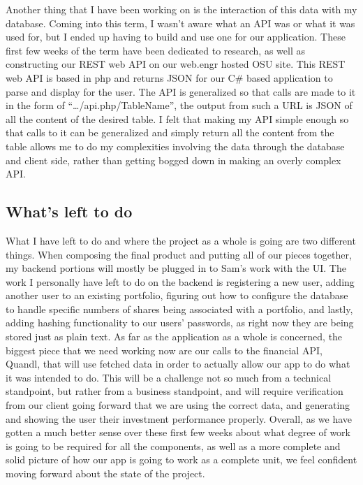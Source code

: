 \documentclass[letterpaper,10pt,titlepage,journal,compsoc,draftclsnofoot,onecolumn]{IEEEtran}
\begin{document}
Another thing that I have been working on is the interaction of this data with my database. Coming into this term, I wasn’t aware what an API was or what it was used for, but I ended up having to build and use one for our application. These first few weeks of the term have been dedicated to research, as well as constructing our REST web API on our web.engr hosted OSU site. This REST web API is based in php and returns JSON for our C\# based application to parse and display for the user.  The API is generalized so that calls are made to it in the form of “…/api.php/{TableName}”, the output from such a URL is JSON of all the content of the desired table. I felt that making my API simple enough so that calls to it can be generalized and simply return all the content from the table allows me to do my complexities involving the data  through the database and client side, rather than getting bogged down in making an overly complex API. 

\subsection{What's left to do}

What I have left to do and where the project as a whole is going are two different things. When composing the final product and putting all of our pieces together, my backend portions will mostly be plugged in to Sam's work with the UI. The work I personally have left to do on the backend is registering a new user, adding another user to an existing portfolio, figuring out how to configure the database to handle specific numbers of shares being associated with a portfolio, and lastly, adding hashing functionality to our users' passwords, as right now they are being stored just as plain text. As far as the application as a whole is concerned, the biggest piece that we need working now are our calls to the financial API, Quandl, that will use fetched data in order to actually allow our app to do what it was intended to do. This will be a challenge not so much from a technical standpoint, but rather from a business standpoint, and will require verification from our client going forward that we are using the correct data, and generating and showing the user their investment performance properly. Overall, as we have gotten a much better sense over these first few weeks about what degree of work is going to be required for all the components, as well as a more complete and solid picture of how our app is going to work as a complete unit, we feel confident moving forward about the state of the project.
\end{document}
